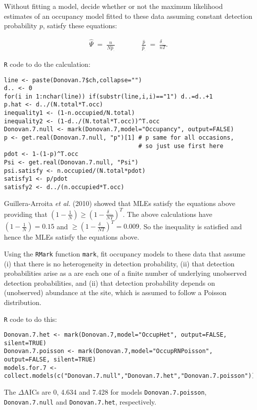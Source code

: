 \begin{questions}
\begin{parts}
{\begin{solution}
\end{solution}}

\item Without fitting a model, decide whether or not the maximum likelihood estimates of an occupancy model fitted to these data assuming constant detection probability $p$, satisfy these equations:

\begin{eqnarray*}
\hat{\Psi}\;=\;\frac{n}{N\hat{p}_\cdot}&\;\;\;\;\;\;\;\;&\frac{\hat{p}}{\hat{p}_\cdot}\;=\;\frac{\delta_{\cdot\cdot}}{nT}.
\end{eqnarray*}

{\begin{solution}
\verb|R| code to do the calculation:
\begin{verbatim}
line <- paste(Donovan.7$ch,collapse="")
d.. <- 0
for(i in 1:nchar(line)) if(substr(line,i,i)=="1") d..=d..+1
p.hat <- d../(N.total*T.occ)
inequality1 <- (1-n.occupied/N.total)
inequality2 <- (1-d../(N.total*T.occ))^T.occ
Donovan.7.null <- mark(Donovan.7,model="Occupancy", output=FALSE)
p <- get.real(Donovan.7.null, "p")[1] # p same for all occasions, 
                                      # so just use first here 
pdot <- 1-(1-p)^T.occ
Psi <- get.real(Donovan.7.null, "Psi")
psi.satisfy <- n.occupied/(N.total*pdot)
satisfy1 <- p/pdot
satisfy2 <- d../(n.occupied*T.occ)
\end{verbatim}
Guillera-Arroita \textit{et al.} (2010) showed that MLEs satisfy the equations above providing that $\left(1-\frac{1}{N}\right)\geq\left(1-\frac{\delta_{\cdot\cdot}}{NT}\right)^T$. The above calculations have $\left(1-\frac{1}{N}\right)=0.15$ and $\geq\left(1-\frac{\delta_{\cdot\cdot}}{NT}\right)^T=0.009$. So the inequality is satisfied and hence the MLEs satisfy the equations above.

\end{solution}}


\item Using the \verb|RMark| function \verb|mark|, fit occupancy models to these data that assume (i) that there is no heterogeneity in detection probability, (ii) that detection probabilities arise as a are each one of a finite number of underlying unobserved detection probabilities, and (ii) that detection probability depends on (unobserved) abundance at the site, which is assumed to follow a Poisson distribution.

{\begin{solution}
\verb|R| code to do this:
\begin{verbatim}
Donovan.7.het <- mark(Donovan.7,model="OccupHet", output=FALSE, silent=TRUE)
Donovan.7.poisson <- mark(Donovan.7,model="OccupRNPoisson", output=FALSE, silent=TRUE)
models.for.7 <- collect.models(c("Donovan.7.null","Donovan.7.het","Donovan.7.poisson"))
\end{verbatim}
The $\Delta$AICs are 0, 4.634 and 7.428 for models \verb|Donovan.7.poisson|,  \verb|Donovan.7.null| and  \verb|Donovan.7.het|, respectively.


\end{solution}}
\end{parts}
\end{questions}
